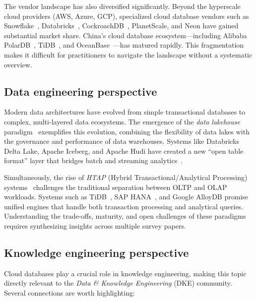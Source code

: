 \documentclass[a4paper,fleqn]{cas-sc}
\begin{document}
The vendor landscape has also diversified significantly. Beyond the hyperscale cloud providers (AWS, Azure, GCP), specialized cloud database vendors such as Snowflake~\cite{Dageville2016}, Databricks~\cite{Armbrust2021Lakehouse}, CockroachDB~\cite{Taft2020Cockroach}, PlanetScale, and Neon have gained substantial market share. China's cloud database ecosystem---including Alibaba PolarDB~\cite{Cao2021PolarDB}, TiDB~\cite{Huang2020TiDB}, and OceanBase~\cite{Yang2022OceanBase}---has matured rapidly. This fragmentation makes it difficult for practitioners to navigate the landscape without a systematic overview.

\subsection{Data engineering perspective}
\label{subsec:dataeng}

Modern data architectures have evolved from simple transactional databases to complex, multi-layered data ecosystems. The emergence of the \emph{data lakehouse} paradigm~\cite{Armbrust2021Lakehouse} exemplifies this evolution, combining the flexibility of data lakes with the governance and performance of data warehouses. Systems like Databricks Delta Lake, Apache Iceberg, and Apache Hudi have created a new ``open table format'' layer that bridges batch and streaming analytics~\cite{Harby2022Lakehouse}.

Simultaneously, the rise of \emph{HTAP} (Hybrid Transactional/Analytical Processing) systems~\cite{Haas2024HTAPSurvey} challenges the traditional separation between OLTP and OLAP workloads. Systems such as TiDB~\cite{Huang2020TiDB}, SAP HANA~\cite{Farber2012}, and Google AlloyDB promise unified engines that handle both transaction processing and analytical queries. Understanding the trade-offs, maturity, and open challenges of these paradigms requires synthesizing insights across multiple survey papers.

\subsection{Knowledge engineering perspective}
\label{subsec:ke}

Cloud databases play a crucial role in knowledge engineering, making this topic directly relevant to the \emph{Data \& Knowledge Engineering} (DKE) community. Several connections are worth highlighting:
\end{document}
